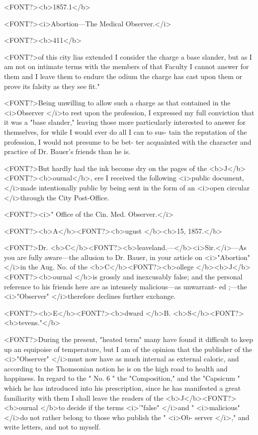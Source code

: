 <FONT?><b>1857.1</b>

<FONT?><i>Abortion---The Medical Observer.</i>

<FONT?><b>411</b>

<FONT?>of this city lias extended I consider the charge a base slander, but as I
am not on intimate terms with the members of that Faculty I cannot
answer for them and I leave them to endure the odium the charge has
cast upon them or prove its falsity as they see fit."

<FONT?>Being unwilling to allow such a charge as that contained in the
<i>Observer </i>to rest upon the profession, I expressed my full conviction
that it was a "base slander," leaving those more particularly interested
to answer for themselves, for while I would ever do all I can to sus-
tain the reputation of the profession, I would not presume to be bet-
ter acquainted with the character and practice of Dr. Bauer's friends
than he is.

<FONT?>But hardly had the ink become dry on the pages of the <b>J</b><FONT?><b>ournal</b>, ere
I received the following <i>public document, </i>made intentionally public by
being sent in the form of an <i>open circular </i>through the City Post-Office.

<FONT?><i>" Office of the Cin. Med. Observer.</i>

<FONT?><b>A</b><FONT?><b>ugust </b><b>15, 1857.</b>

<FONT?>Dr. <b>C</b><FONT?><b>leaveland.---</b><i>Sir.</i>---As you are fully aware---the allusion to
Dr. Bauer, in your article on <i>"Abortion" </i>in the Aug. No. of the
<b>C</b><FONT?><b>ollege </b><b>J</b><FONT?><b>ournal </b>is grossly and inexcusably false; and the personal
reference to his friends here are as intensely malicious---as unwarrant-
ed ;---the <i>"Observer" </i>therefore declines further exchange.

<FONT?><b>E</b><FONT?><b>dward </b>B. <b>S</b><FONT?><b>tevens."</b>

<FONT?>During the present, "heated term" many have found it difficult to
keep up an equipoise of temperature, but I am of the opinion that the
publisher of the <i>"Observer" </i>must now have as much internal as
external caloric, and according to the Thomsonian notion he is on
the high road to health and happiness. In regard to the " No. 6 " the
"Composition," and the "Capsicum " which he has introduced into
his prescription, since he has manifested a great familiarity with them
I shall leave the readers of the <b>J</b><FONT?><b>ournal </b>to decide if the terms <i>'"false"
</i>and " <i>malicious" </i>do not rather belong to those who publish the " <i>Ob-
server </i>," and write letters, and not to myself.

